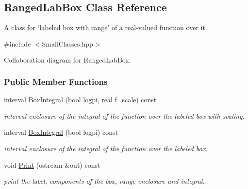 \hypertarget{classRangedLabBox}{\subsection{\-Ranged\-Lab\-Box \-Class \-Reference}
\label{classRangedLabBox}
}


\-A class for `labeled box with range' of a real-\/valued function over it.  




{\ttfamily \#include $<$\-Small\-Classes.\-hpp$>$}



\-Collaboration diagram for \-Ranged\-Lab\-Box\-:
\subsubsection*{\-Public \-Member \-Functions}
\begin{DoxyCompactItemize}
\item 
interval \hyperlink{classRangedLabBox_a42112d471f344fe4b1d6b25ad69dbe24}{\-Box\-Integral} (bool logpi, real f\-\_\-scale) const 
\begin{DoxyCompactList}\small\item\em interval enclosure of the integral of the function over the labeled box with scaling. \end{DoxyCompactList}\item 
interval \hyperlink{classRangedLabBox_aa1df213904910695bc467278ac2c8ab8}{\-Box\-Integral} (bool logpi) const 
\begin{DoxyCompactList}\small\item\em interval enclosure of the integral of the function over the labeled box. \end{DoxyCompactList}\item 
void \hyperlink{classRangedLabBox_a9e8b6e359342c3273f655507a7b9c6b9}{\-Print} (ostream \&out) const 
\begin{DoxyCompactList}\small\item\em print the label, components of the box, range enclosure and integral. \end{DoxyCompactList}\end{DoxyCompactItemize}

